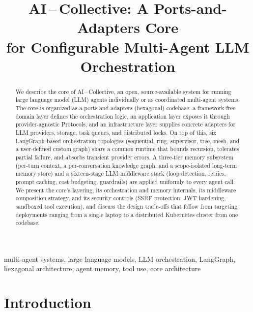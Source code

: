 \documentclass[conference]{IEEEtran}
\begin{document}
\title{AI\,--\,Collective: A Ports-and-Adapters Core\\for Configurable Multi-Agent LLM Orchestration}

\author{
}

\maketitle

\begin{abstract}
We describe the core of AI\,--\,Collective, an open, source-available
system for running large language model (LLM) agents individually or as
coordinated multi-agent systems. The core is organized as a
ports-and-adapters (hexagonal) codebase: a framework-free domain layer
defines the orchestration logic, an application layer exposes it through
provider-agnostic Protocols, and an infrastructure layer supplies concrete
adapters for LLM providers, storage, task queues, and distributed locks. On
top of this, six LangGraph-based orchestration topologies (sequential,
ring, supervisor, tree, mesh, and a user-defined custom graph) share a
common runtime that bounds recursion, tolerates partial failure, and
absorbs transient provider errors. A three-tier memory subsystem
(per-turn context, a per-conversation knowledge graph, and a
scope-isolated long-term memory store) and a sixteen-stage LLM middleware
stack (loop detection, retries, prompt caching, cost budgeting, guardrails)
are applied uniformly to every agent call. We present the core's
layering, its orchestration and memory internals, its middleware
composition strategy, and its security controls (SSRF protection, JWT
hardening, sandboxed tool execution), and discuss the design trade-offs
that follow from targeting deployments ranging from a single laptop to a
distributed Kubernetes cluster from one codebase.
\end{abstract}

\begin{IEEEkeywords}
multi-agent systems, large language models, LLM orchestration, LangGraph,
hexagonal architecture, agent memory, tool use, core architecture
\end{IEEEkeywords}

\section{Introduction}
\end{document}
